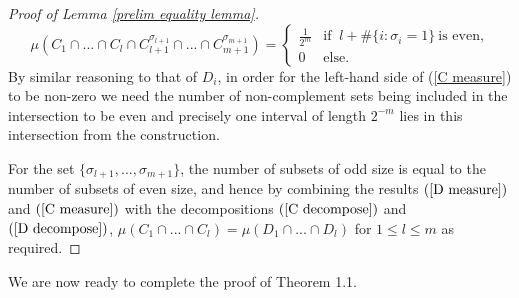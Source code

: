 \documentclass[12pt]{article}
\begin{document}
\begin{proof}[Proof of Lemma \ref{prelim equality lemma}]
\begin{equation}\label{C measure}
\mu\left(C_1\cap...\cap C_l \cap C_{l+1}^{\sigma_{l+1}} \cap...\cap C_{m+1}^{\sigma_{m+1}} \right)=
    \begin{cases}
        \frac{1}{2^m}  & \text{if } ~ l+ \#\{i:\sigma_i=1\} ~\text{is even,}\\
        0 & \text{else. }
    \end{cases}
\end{equation}
By similar reasoning to that of $D_i$, in order for the left-hand side of (\ref{C measure}) to be non-zero we need the number of non-complement sets being included in the intersection to be even and precisely one interval of length $2^{-m}$ lies in this intersection from the construction.

 For the set $\{ \sigma_{l+1},...,\sigma_{m+1} \}$, the number of subsets of odd size is equal to the number of subsets of even size, and hence by combining the results $(\ref{D measure})$ and $(\ref{C measure})$ with the decompositions $(\ref{C decompose})$ and $(\ref{D decompose})$, $\mu(C_1\cap...\cap C_l)=\mu(D_1\cap...\cap D_l)$ for $1 \leq l \leq m$ as required.
\end{proof}

We are now ready to complete the proof of Theorem 1.1.
\end{document}
